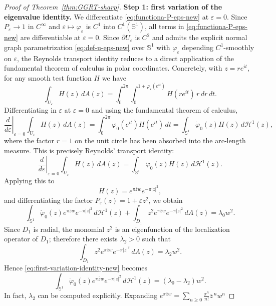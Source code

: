 \begin{proof}[Proof of Theorem~\ref{thm:GGRT-sharp}]
\medskip
\noindent
{\bf Step 1: first variation of the eigenvalue identity.} We differentiate \eqref{eq:functiona-P-eps-new} at $\varepsilon=0$.
Since \(P_\varepsilon\to 1\) in \(C^\infty\) and
\(\varepsilon\mapsto \varphi_\varepsilon\) is \(C^1\) into \(C^1(\mathbb S^1)\),
all terms in \eqref{eq:functiona-P-eps-new} are differentiable at
\(\varepsilon=0\). Since $\partial U_\varepsilon$ is $C^2$ and admits the
explicit normal graph parametrization \eqref{eq:def-u-eps-new} over
$\mathbb S^1$ with $\varphi_\varepsilon$ depending $C^1$-smoothly on
$\varepsilon$, the Reynolds transport identity reduces to a direct application
of the fundamental theorem of calculus in polar coordinates. Concretely, with
\(z=re^{it}\), for any smooth test function \(H\) we have
\[
\int_{U_\varepsilon} H(z)\,dA(z)
=
\int_0^{2\pi}\int_0^{1+\varphi_\varepsilon(e^{it})}
H(re^{it})\,r\,dr\,dt.
\]
Differentiating in \(\varepsilon\) at \(\varepsilon=0\) and using the
fundamental theorem of calculus,
\[
\left.\frac{d}{d\varepsilon}\right|_{\varepsilon=0}
\int_{U_\varepsilon} H(z)\,dA(z)
=
\int_0^{2\pi}\dot\varphi_0(e^{it})H(e^{it})\,dt
=
\int_{\mathbb S^1}\dot\varphi_0(z)H(z)\,d\mathcal H^1(z),
\]
where the factor \(r=1\) on the unit circle has been absorbed into the
arc-length measure. This is precisely Reynolds' transport identity:
\[
\left.\frac{d}{d\varepsilon}\right|_{\varepsilon=0}
\int_{U_\varepsilon} H(z)\,dA(z)
=
\int_{\mathbb S^1} \dot\varphi_0(z)H(z)\,d\mathcal H^1(z).
\]
Applying this to
\[
H(z)=e^{\pi \overline zw}e^{-\pi|z|^2},
\]
and differentiating the factor $P_\varepsilon(z)=1+\varepsilon z^2$, we obtain
\begin{equation}\label{eq:first-variation-identity-new}
\int_{\mathbb S^1}
\dot\varphi_0(z)e^{\pi \overline zw}e^{-\pi|z|^2}\,d\mathcal H^1(z)
+
\int_{D_1} z^2 e^{\pi \overline zw}e^{-\pi|z|^2}\,dA(z)
=
\lambda_0 w^2.
\end{equation}
Since $D_1$ is radial, the monomial $z^2$ is an eigenfunction of the
localization operator of $D_1$; therefore there exists $\lambda_2>0$ such that
\[
\int_{D_1} z^2 e^{\pi \overline zw}e^{-\pi|z|^2}\,dA(z)=\lambda_2 w^2.
\]
Hence \eqref{eq:first-variation-identity-new} becomes
\begin{equation}\label{eq:boundary-identity-new}
\int_{\mathbb S^1}
\dot\varphi_0(z)e^{\pi \overline zw}e^{-\pi|z|^2}\,d\mathcal H^1(z)
=
(\lambda_0-\lambda_2)w^2.
\end{equation}
In fact, \(\lambda_2\) can be computed explicitly. Expanding
\(e^{\pi \overline zw}=\sum_{n\geq 0}\frac{\pi^n}{n!}\overline z^{\,n}w^n\)

\end{proof}
